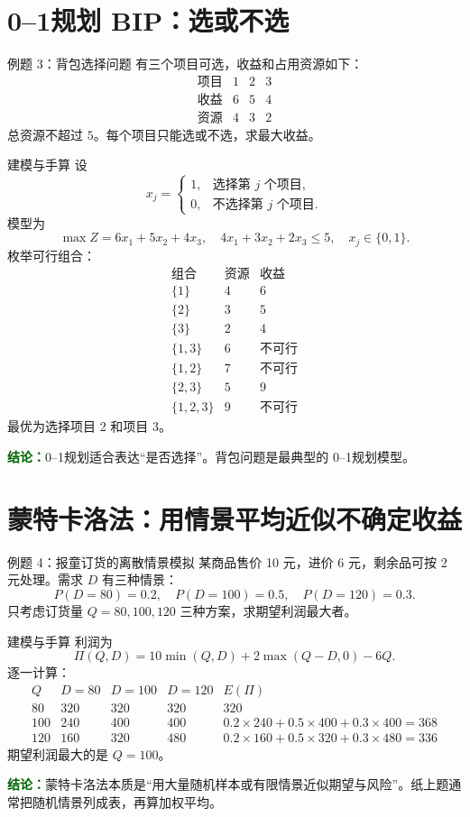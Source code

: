 \documentclass[UTF8,12pt,a4paper]{ctexart}
\newcommand{\conclusion}[1]{\par\smallskip\noindent\textcolor{darkgreen}{\textbf{结论：}}#1\par\smallskip}
\begin{document}
\section{0--1规划 BIP：选或不选}
\begin{examplebox}{例题 3：背包选择问题}
有三个项目可选，收益和占用资源如下：
\[
\begin{array}{c|ccc}
\text{项目}&1&2&3\\
\hline
\text{收益}&6&5&4\\
\text{资源}&4&3&2
\end{array}
\]
总资源不超过 $5$。每个项目只能选或不选，求最大收益。
\end{examplebox}

\begin{solbox}{建模与手算}
设
\[
x_j=\begin{cases}1,&\text{选择第 }j\text{ 个项目},\\0,&\text{不选择第 }j\text{ 个项目}.
\end{cases}
\]
模型为
\[
\max Z=6x_1+5x_2+4x_3,
\quad 4x_1+3x_2+2x_3\le 5,
\quad x_j\in\{0,1\}.
\]
枚举可行组合：
\[
\begin{array}{c|c|c}
\text{组合}&\text{资源}&\text{收益}\\
\hline
\{1\}&4&6\\
\{2\}&3&5\\
\{3\}&2&4\\
\{1,3\}&6&\text{不可行}\\
\{1,2\}&7&\text{不可行}\\
\{2,3\}&5&9\\
\{1,2,3\}&9&\text{不可行}
\end{array}
\]
最优为选择项目 2 和项目 3。
\end{solbox}
\conclusion{0--1规划适合表达“是否选择”。背包问题是最典型的 0--1规划模型。}

\section{蒙特卡洛法：用情景平均近似不确定收益}
\begin{examplebox}{例题 4：报童订货的离散情景模拟}
某商品售价 10 元，进价 6 元，剩余品可按 2 元处理。需求 $D$ 有三种情景：
\[
P(D=80)=0.2,
\quad P(D=100)=0.5,
\quad P(D=120)=0.3.
\]
只考虑订货量 $Q=80,100,120$ 三种方案，求期望利润最大者。
\end{examplebox}

\begin{solbox}{建模与手算}
利润为
\[
\Pi(Q,D)=10\min(Q,D)+2\max(Q-D,0)-6Q.
\]
逐一计算：
\[
\begin{array}{c|ccc|c}
Q&D=80&D=100&D=120&E(\Pi)\\
\hline
80&320&320&320&320\\
100&240&400&400&0.2\times240+0.5\times400+0.3\times400=368\\
120&160&320&480&0.2\times160+0.5\times320+0.3\times480=336
\end{array}
\]
期望利润最大的是 $Q=100$。
\end{solbox}
\conclusion{蒙特卡洛法本质是“用大量随机样本或有限情景近似期望与风险”。纸上题通常把随机情景列成表，再算加权平均。}
\end{document}
